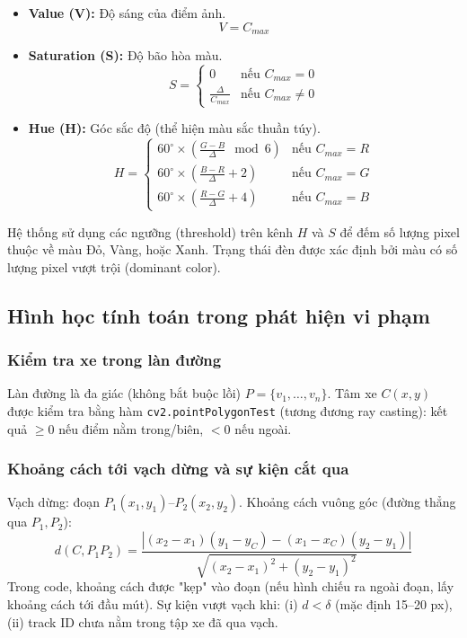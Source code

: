 \begin{itemize}
    \item \textbf{Value (V):} Độ sáng của điểm ảnh.
    \begin{equation}
        V = C_{max}
    \end{equation}
    \item \textbf{Saturation (S):} Độ bão hòa màu.
    \begin{equation}
        S = \begin{cases}
            0 & \text{nếu } C_{max} = 0 \\
            \frac{\Delta}{C_{max}} & \text{nếu } C_{max} \neq 0
        \end{cases}
    \end{equation}
    \item \textbf{Hue (H):} Góc sắc độ (thể hiện màu sắc thuần túy).
    \begin{equation}
        H = \begin{cases}
            60^\circ \times (\frac{G - B}{\Delta} \mod 6) & \text{nếu } C_{max} = R \\
            60^\circ \times (\frac{B - R}{\Delta} + 2) & \text{nếu } C_{max} = G \\
            60^\circ \times (\frac{R - G}{\Delta} + 4) & \text{nếu } C_{max} = B
        \end{cases}
    \end{equation}
\end{itemize}

Hệ thống sử dụng các ngưỡng (threshold) trên kênh $H$ và $S$ để đếm số lượng pixel thuộc về màu Đỏ, Vàng, hoặc Xanh. Trạng thái đèn được xác định bởi màu có số lượng pixel vượt trội (dominant color).

\subsection{Hình học tính toán trong phát hiện vi phạm}

\subsubsection{Kiểm tra xe trong làn đường}
Làn đường là đa giác (không bắt buộc lồi) \(P = \{v_1,\dots,v_n\}\). Tâm xe \(C(x,y)\) được kiểm tra bằng hàm \texttt{cv2.pointPolygonTest} (tương đương ray casting): kết quả \(\ge 0\) nếu điểm nằm trong/biên, \(<0\) nếu ngoài.

\subsubsection{Khoảng cách tới vạch dừng và sự kiện cắt qua}
Vạch dừng: đoạn \(P_1(x_1,y_1)\)--\(P_2(x_2,y_2)\). Khoảng cách vuông góc (đường thẳng qua \(P_1,P_2\)):
\[
d(C, P_1P_2) = \frac{|(x_2 - x_1)(y_1 - y_C) - (x_1 - x_C)(y_2 - y_1)|}{\sqrt{(x_2 - x_1)^2 + (y_2 - y_1)^2}}
\]
Trong code, khoảng cách được "kẹp" vào đoạn (nếu hình chiếu ra ngoài đoạn, lấy khoảng cách tới đầu mút).
Sự kiện vượt vạch khi: (i) \(d < \delta\) (mặc định 15--20 px), (ii) track ID chưa nằm trong tập xe đã qua vạch.

